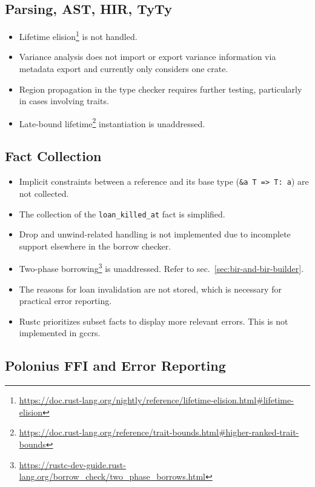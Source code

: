 \documentclass[
  11pt,
  twoside]{report}
\providecommand{\tightlist}{%
  \setlength{\itemsep}{0pt}\setlength{\parskip}{0pt}}
\DeclareRobustCommand{\href}[2]{#2\footnote{\url{#1}}}
\begin{document}
\subsection{Parsing, AST, HIR, TyTy}\label{sec:parsing-ast-hir-tyty}

\begin{itemize}
\tightlist
\item
  \href{https://doc.rust-lang.org/nightly/reference/lifetime-elision.html\#lifetime-elision}{Lifetime
  elision} is not handled.
\item
  Variance analysis does not import or export variance information via
  metadata export and currently only considers one crate.
\item
  Region propagation in the type checker requires further testing,
  particularly in cases involving traits.
\item
  \href{https://doc.rust-lang.org/reference/trait-bounds.html\#higher-ranked-trait-bounds}{Late-bound
  lifetime} instantiation is unaddressed.
\end{itemize}

\subsection{Fact Collection}\label{sec:fact-collection}

\begin{itemize}
\tightlist
\item
  Implicit constraints between a reference and its base type
  (\texttt{\&\textquotesingle{}a\ T\ =\textgreater{}\ T:\ \textquotesingle{}a})
  are not collected.
\item
  The collection of the \texttt{loan\_killed\_at} fact is simplified.
\item
  Drop and unwind-related handling is not implemented due to incomplete
  support elsewhere in the borrow checker.
\item
  \href{https://rustc-dev-guide.rust-lang.org/borrow_check/two_phase_borrows.html}{Two-phase
  borrowing} is unaddressed. Refer to
  sec.~\ref{sec:bir-and-bir-builder}.
\item
  The reasons for loan invalidation are not stored, which is necessary
  for practical error reporting.
\item
  Rustc prioritizes subset facts to display more relevant errors. This
  is not implemented in gccrs.
\end{itemize}

\subsection{Polonius FFI and Error
Reporting}\label{sec:polonius-ffi-and-error-reporting}
\end{document}
